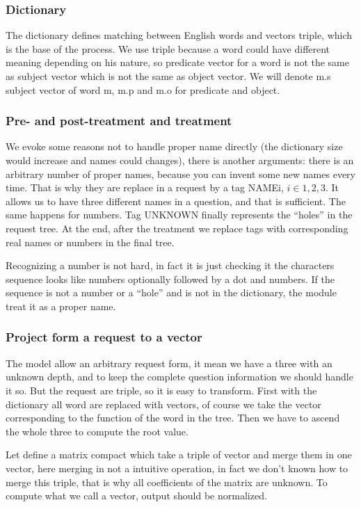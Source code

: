 \subsubsection{Dictionary}

The dictionary defines matching between English words and vectors triple, which is the base of the process. We use triple because a word could have different meaning depending on his nature, so predicate vector for a word is not the same as subject vector which is not the same as object vector. We will denote m.s subject vector of word m, m.p and m.o for predicate and object.

\subsubsection{Pre- and post-treatment and treatment}

We evoke some reasons not to handle proper name directly (the dictionary size would increase and names could changes), there is another arguments: there is an arbitrary number of proper names, because you can invent some new names every time. That is why they are replace in a request by a tag NAMEi, $i\in{1,2,3}$. It allows us to have three different names in a question, and that is sufficient. The same happens for numbers. Tag UNKNOWN finally represents the ``holes'' in the request tree. At the end, after the treatment we replace tags with corresponding real names or numbers in the final tree.

Recognizing a number is not hard, in fact it is just checking it the characters sequence looks like numbers optionally followed by a dot and numbers. If the sequence is not a number or a ``hole'' and is not in the dictionary, the module treat it as a proper name.

\subsubsection{Project form a request to a vector}

The model allow an arbitrary request form, it mean we have a three with an unknown depth, and to keep the complete question information we should handle it so. But the request are triple, so it is easy to transform. First with the dictionary all word are replaced with vectors, of course we take the vector corresponding to the function of the word in the tree. Then we have to ascend the whole three to compute the root value.

Let define a matrix compact which take a triple of vector and merge them in one vector, here merging in not a intuitive operation, in fact we don't known how to merge this triple, that is why all coefficients of the matrix are unknown. To compute what we call a vector, output should be normalized.


